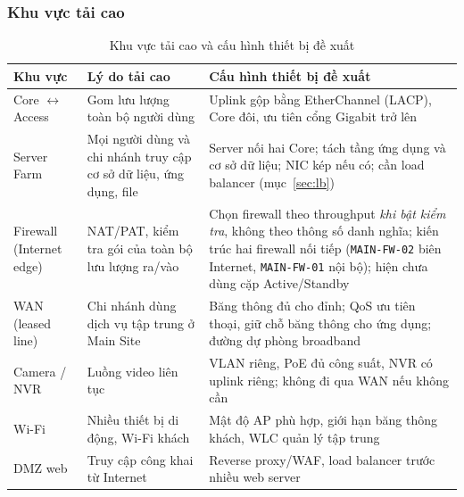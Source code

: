 \subsubsection{Khu vực tải cao}
\begin{small}
\setlength{\tabcolsep}{4pt}
\begin{longtable}{|p{2.8cm}|p{4.0cm}|p{7.0cm}|}
\caption{Khu vực tải cao và cấu hình thiết bị đề xuất} \label{tab:high_load} \\
\hline
\textbf{Khu vực} & \textbf{Lý do tải cao} & \textbf{Cấu hình thiết bị đề xuất} \\ \hline
\endhead
Core $\leftrightarrow$ Access & Gom lưu lượng toàn bộ người dùng & Uplink gộp bằng EtherChannel (LACP), Core đôi, ưu tiên cổng Gigabit trở lên \\ \hline
Server Farm & Mọi người dùng và chi nhánh truy cập cơ sở dữ liệu, ứng dụng, file & Server nối hai Core; tách tầng ứng dụng và cơ sở dữ liệu; NIC kép nếu có; cần load balancer (mục~\ref{sec:lb}) \\ \hline
Firewall (Internet edge) & NAT/PAT, kiểm tra gói của toàn bộ lưu lượng ra/vào & Chọn firewall theo throughput \emph{khi bật kiểm tra}, không theo thông số danh nghĩa; kiến trúc hai firewall nối tiếp (\texttt{MAIN-FW-02} biên Internet, \texttt{MAIN-FW-01} nội bộ); hiện chưa dùng cặp Active/Standby \\ \hline
WAN (leased line) & Chi nhánh dùng dịch vụ tập trung ở Main Site & Băng thông đủ cho đỉnh; QoS ưu tiên thoại, giữ chỗ băng thông cho ứng dụng; đường dự phòng broadband \\ \hline
Camera / NVR & Luồng video liên tục & VLAN riêng, PoE đủ công suất, NVR có uplink riêng; không đi qua WAN nếu không cần \\ \hline
Wi-Fi & Nhiều thiết bị di động, Wi-Fi khách & Mật độ AP phù hợp, giới hạn băng thông khách, WLC quản lý tập trung \\ \hline
DMZ web & Truy cập công khai từ Internet & Reverse proxy/WAF, load balancer trước nhiều web server \\ \hline
\end{longtable}
\end{small}

